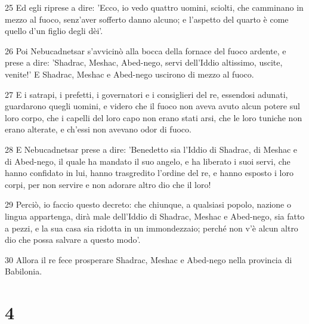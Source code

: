 \par 25 Ed egli riprese a dire: 'Ecco, io vedo quattro uomini, sciolti, che camminano in mezzo al fuoco, senz'aver sofferto danno alcuno; e l'aspetto del quarto è come quello d'un figlio degli dèi'.
\par 26 Poi Nebucadnetsar s'avvicinò alla bocca della fornace del fuoco ardente, e prese a dire: 'Shadrac, Meshac, Abed-nego, servi dell'Iddio altissimo, uscite, venite!' E Shadrac, Meshac e Abed-nego uscirono di mezzo al fuoco.
\par 27 E i satrapi, i prefetti, i governatori e i consiglieri del re, essendosi adunati, guardarono quegli uomini, e videro che il fuoco non aveva avuto alcun potere sul loro corpo, che i capelli del loro capo non erano stati arsi, che le loro tuniche non erano alterate, e ch'essi non avevano odor di fuoco.
\par 28 E Nebucadnetsar prese a dire: 'Benedetto sia l'Iddio di Shadrac, di Meshac e di Abed-nego, il quale ha mandato il suo angelo, e ha liberato i suoi servi, che hanno confidato in lui, hanno trasgredito l'ordine del re, e hanno esposto i loro corpi, per non servire e non adorare altro dio che il loro!
\par 29 Perciò, io faccio questo decreto: che chiunque, a qualsiasi popolo, nazione o lingua appartenga, dirà male dell'Iddio di Shadrac, Meshac e Abed-nego, sia fatto a pezzi, e la sua casa sia ridotta in un immondezzaio; perché non v'è alcun altro dio che possa salvare a questo modo'.
\par 30 Allora il re fece prosperare Shadrac, Meshac e Abed-nego nella provincia di Babilonia.

\chapter{4}


